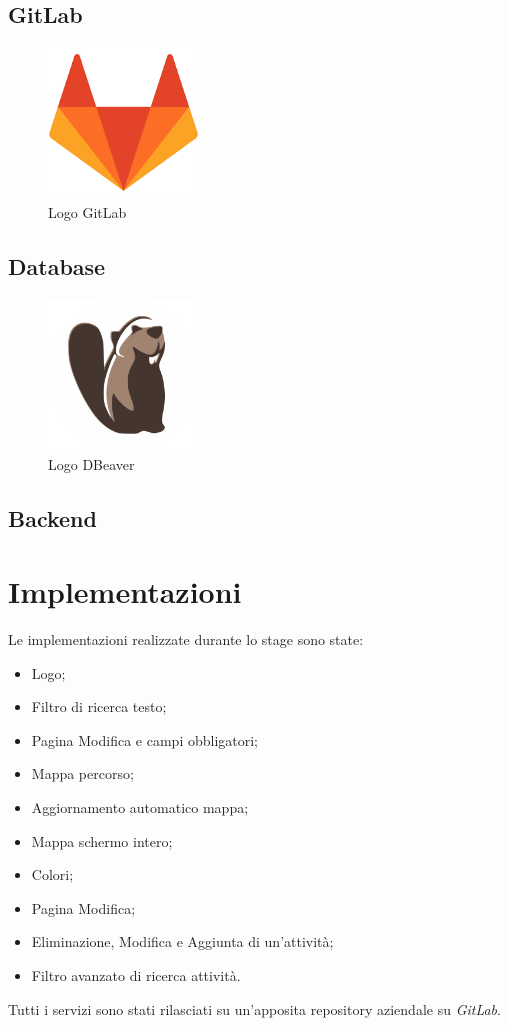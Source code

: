 \subsection{GitLab}

\begin{figure}[htbp]	
	\centering
	\includegraphics[width=4cm]{immagini/logogitlab.png}
	\caption{Logo GitLab}
	\label{fig:Logo GitLab}
\end{figure}

\subsection{Database}

\begin{figure}[htbp]	
	\centering
	\includegraphics[width=4cm]{immagini/logodbeaver.png}
	\caption{Logo DBeaver}
	\label{fig:Logo DBeaver}
\end{figure}

\subsection{Backend}

\newpage

\section{Implementazioni}

Le implementazioni realizzate durante lo stage sono state: 
\begin{itemize}
	\item Logo;
	\item Filtro di ricerca testo;
	\item Pagina Modifica e campi obbligatori;
	\item Mappa percorso;
	\item Aggiornamento automatico mappa;
	\item Mappa schermo intero;
	\item Colori;
	\item Pagina Modifica;
	\item Eliminazione, Modifica e Aggiunta di un'attività;
	\item Filtro avanzato di ricerca attività.
\end{itemize}
Tutti i servizi sono stati rilasciati su un'apposita repository aziendale su \textit{GitLab}.

